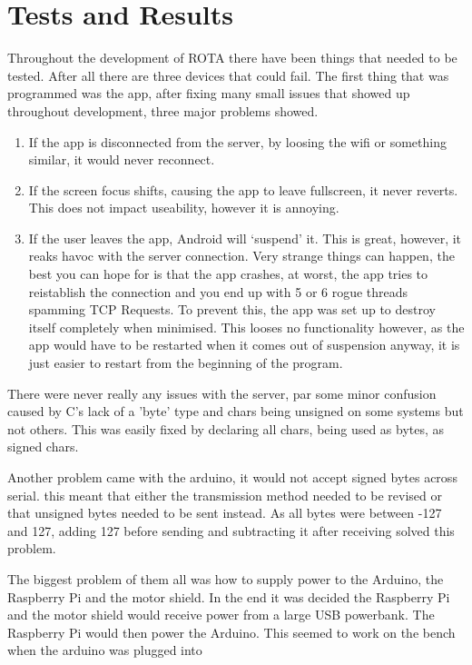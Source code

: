 \section{Tests and Results}
\par Throughout the development of ROTA there have been things that needed to be tested.
After all there are three devices that could fail. The first thing that was programmed was
the app, after fixing many small issues that showed up throughout development, three major
problems showed.
\begin{enumerate}
  \item If the app is disconnected from the server, by loosing the wifi or something
  similar, it would never reconnect. %
  \item If the screen focus shifts, causing the app to leave fullscreen, it never reverts.
  This does not impact useability, however it is annoying.
  \item If the user leaves the app, Android will `suspend' it. This is great, however,
  it reaks havoc with the server connection. Very strange things can happen, the best
  you can hope for is that the app crashes, at worst, the app tries to reistablish the
  connection and you end up with 5 or 6 rogue threads spamming TCP Requests.
  To prevent this, the app was set up to destroy itself completely when minimised. This
  looses no functionality however, as the app would have to be restarted when it comes
  out of suspension anyway, it is just easier to restart from the beginning of the program.
\end{enumerate}
There were never really any issues with the server, par some minor confusion caused by
C's lack of a 'byte' type and chars being unsigned on some systems but not others.
This was easily fixed by declaring all chars, being used as bytes, as signed chars.
\par
Another problem came with the arduino, it would not accept signed bytes across serial.
this meant that either the transmission method needed to be revised or that unsigned bytes
needed to be sent instead. As all bytes were between -127 and 127, adding 127 before sending
and subtracting it after receiving solved this problem.
\par
The biggest problem of them all was how to supply power to the Arduino,
the Raspberry Pi and the motor shield. In the end it was decided the Raspberry Pi and
the motor shield would receive power from a large USB powerbank. The Raspberry Pi would
then power the Arduino. This seemed to work on the bench when the arduino was plugged into
